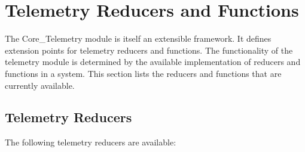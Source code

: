 \newpage
\section{Telemetry Reducers and Functions} \label{Implementation:ReducersFunctions}

The Core\_Telemetry module is itself an extensible framework. It defines extension points for telemetry reducers and functions. The functionality of the telemetry module is determined by the available implementation of reducers and functions in a system. This section lists the reducers and functions that are currently available.







\subsection{Telemetry Reducers} \label{Implementation:Reducers}

The following telemetry reducers are available:


